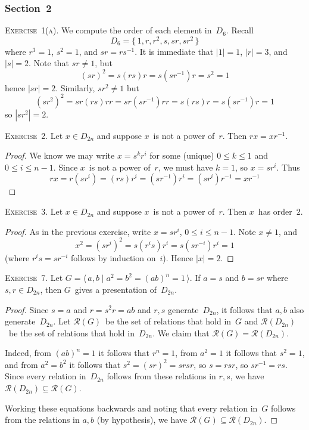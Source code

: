 \documentclass[letterpaper]{article}
\newcommand{\exercise}[1]{\goodbreak\noindent\textsc{Exercise~{#1}.}}
\newcommand{\rel}{\mathcal{R}}
\newcommand{\ord}[1]{|{#1}|}
\newcommand{\pres}[1]{\langle{#1}\rangle}
\begin{document}
\subsubsection*{Section~2}
\exercise{1(a)}
We compute the order of each element in~$D_6$. Recall
$$D_6=\{\,1,r,r^2,s,sr,sr^2\,\}$$
where $r^3=1$, $s^2=1$, and $sr=rs^{-1}$. It is immediate that $\ord{1}=1$, $\ord{r}=3$, and $\ord{s}=2$. Note that $sr\ne 1$, but
$$(sr)^2=s(rs)r=s(sr^{-1})r=s^2=1$$
hence $\ord{sr}=2$. Similarly, $sr^2\ne 1$ but
$$(sr^2)^2=sr(rs)rr=sr(sr^{-1})rr=s(rs)r=s(sr^{-1})r=1$$
so $\ord{sr^2}=2$.

\bigskip
\exercise{2}
Let $x\in D_{2n}$ and suppose $x$~is not a power of~$r$. Then $rx=xr^{-1}$.
\begin{proof}
We know we may write $x=s^kr^i$ for some (unique) $0\le k\le 1$ and $0\le i\le n-1$. Since $x$~is not a power of~$r$, we must have $k=1$, so $x=sr^i$. Thus
$$rx=r(sr^i)=(rs)r^i=(sr^{-1})r^i=(sr^{i})r^{-1}=xr^{-1}$$
\end{proof}

\exercise{3}
Let $x\in D_{2n}$ and suppose $x$~is not a power of~$r$. Then $x$~has order~$2$.
\begin{proof}
As in the previous exercise, write $x=sr^i$, $0\le i\le n-1$. Note $x\ne 1$, and
$$x^2=(sr^i)^2=s(r^is)r^i=s(sr^{-i})r^i=1$$
(where $r^is=sr^{-i}$ follows by induction on~$i$). Hence $\ord{x}=2$.
\end{proof}

\exercise{7}
Let $G=\pres{\,a,b\mid a^2=b^2=(ab)^n=1\,}$. If $a=s$ and $b=sr$ where $s,r\in D_{2n}$, then $G$~gives a presentation of~$D_{2n}$.
\begin{proof}
Since $s=a$ and $r=s^2r=ab$ and $r,s$ generate~$D_{2n}$, it follows that $a,b$ also generate~$D_{2n}$. Let $\rel(G)$~be the set of relations that hold in~$G$ and $\rel(D_{2n})$~be the set of relations that hold in~$D_{2n}$. We claim that $\rel(G)=\rel(D_{2n})$.

Indeed, from $(ab)^n=1$ it follows that $r^n=1$, from $a^2=1$ it follows that $s^2=1$, and from $a^2=b^2$ it follows that $s^2=(sr)^2=srsr$, so $s=rsr$, so $sr^{-1}=rs$. Since every relation in~$D_{2n}$ follows from these relations in $r,s$, we have $\rel(D_{2n})\subseteq\rel(G)$.

Working these equations backwards and noting that every relation in~$G$ follows from the relations in $a,b$ (by hypothesis), we have $\rel(G)\subseteq\rel(D_{2n})$.
\end{proof}
\end{document}
